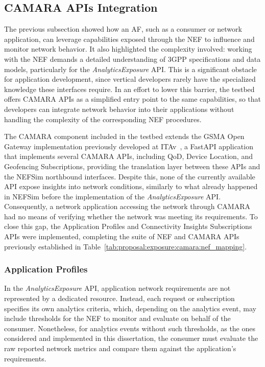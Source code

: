 \subsection{CAMARA \acsp{API} Integration}
\label{chap:impl:exposure:camara}

The previous subsection showed how an \acs{AF}, such as a consumer or network application, can leverage capabilities exposed through the \acs{NEF} to influence and monitor network behavior. It also highlighted the complexity involved: working with the \acs{NEF} demands a detailed understanding of \acs{3GPP} specifications and data models, particularly for the \textit{AnalyticsExposure} \acs{API}. This is a significant obstacle for application development, since vertical developers rarely have the specialized knowledge these interfaces require. In an effort to lower this barrier, the testbed offers CAMARA \acsp{API} as a simplified entry point to the same capabilities, so that developers can integrate network behavior into their applications without handling the complexity of the corresponding \acs{NEF} procedures.

The CAMARA component included in the testbed extends the \acs{GSMA} Open Gateway implementation previously developed at \acs{ITAv}~\cite{GSMANEFprojectIT}, a FastAPI application that implements several CAMARA \acsp{API}, including \acs{QoD}, Device Location, and Geofencing Subscriptions, providing the translation layer between these \acsp{API} and the \acs{NEF}Sim northbound interfaces. Despite this, none of the currently available \acs{API} expose insights into network conditions, similarly to what already happened in \acs{NEF}Sim before the implementation of the \textit{AnalyticsExposure} \acs{API}. Consequently, a network application accessing the network through CAMARA had no means of verifying whether the network was meeting its requirements. To close this gap, the Application Profiles and Connectivity Insights Subscriptions \acsp{API} were implemented, completing the suite of \acs{NEF} and CAMARA \acsp{API} previously established in Table~\ref{tab:proposal:exposure:camara:nef_mapping}.

\subsubsection{Application Profiles}
\label{chap:impl:exposure:camara:profiles}

In the \textit{AnalyticsExposure} \acs{API}, application network requirements are not represented by a dedicated resource. Instead, each request or subscription specifies its own analytics criteria, which, depending on the analytics event, may include thresholds for the \acs{NEF} to monitor and evaluate on behalf of the consumer. Nonetheless, for analytics events without such thresholds, as the ones considered and implemented in this dissertation, the consumer must evaluate the raw reported network metrics and compare them against the application's requirements.

